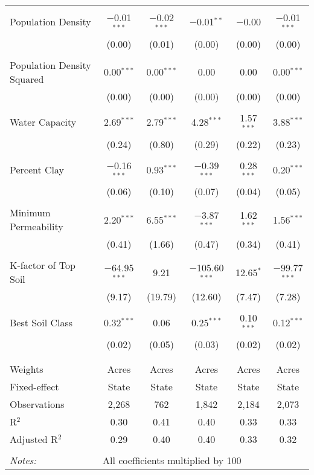 \documentclass[10pt]{article}
\begin{document}
\begin{table}[!htbp]
\begin{tabular}{@{\extracolsep{5pt}}lccccc}
  & & & & & \\ 
 Population Density & $-$0.01$^{***}$ & $-$0.02$^{***}$ & $-$0.01$^{**}$ & $-$0.00 & $-$0.01$^{***}$ \\ 
  & (0.00) & (0.01) & (0.00) & (0.00) & (0.00) \\ 
  & & & & & \\ 
 Population Density Squared & 0.00$^{***}$ & 0.00$^{***}$ & 0.00 & 0.00 & 0.00$^{***}$ \\ 
  & (0.00) & (0.00) & (0.00) & (0.00) & (0.00) \\ 
  & & & & & \\ 
 Water Capacity & 2.69$^{***}$ & 2.79$^{***}$ & 4.28$^{***}$ & 1.57$^{***}$ & 3.88$^{***}$ \\ 
  & (0.24) & (0.80) & (0.29) & (0.22) & (0.23) \\ 
  & & & & & \\ 
 Percent Clay & $-$0.16$^{***}$ & 0.93$^{***}$ & $-$0.39$^{***}$ & 0.28$^{***}$ & 0.20$^{***}$ \\ 
  & (0.06) & (0.10) & (0.07) & (0.04) & (0.05) \\ 
  & & & & & \\ 
 Minimum Permeability & 2.20$^{***}$ & 6.55$^{***}$ & $-$3.87$^{***}$ & 1.62$^{***}$ & 1.56$^{***}$ \\ 
  & (0.41) & (1.66) & (0.47) & (0.34) & (0.41) \\ 
  & & & & & \\ 
 K-factor of Top Soil & $-$64.95$^{***}$ & 9.21 & $-$105.60$^{***}$ & 12.65$^{*}$ & $-$99.77$^{***}$ \\ 
  & (9.17) & (19.79) & (12.60) & (7.47) & (7.28) \\ 
  & & & & & \\ 
 Best Soil Class & 0.32$^{***}$ & 0.06 & 0.25$^{***}$ & 0.10$^{***}$ & 0.12$^{***}$ \\ 
  & (0.02) & (0.05) & (0.03) & (0.02) & (0.02) \\ 
  & & & & & \\ 
\hline \\[-1.8ex] 
Weights & Acres & Acres & Acres & Acres & Acres \\ 
Fixed-effect & State & State & State & State & State \\ 
Observations & 2,268 & 762 & 1,842 & 2,184 & 2,073 \\ 
R$^{2}$ & 0.30 & 0.41 & 0.40 & 0.33 & 0.33 \\ 
Adjusted R$^{2}$ & 0.29 & 0.40 & 0.40 & 0.33 & 0.32 \\ 
\hline 
\hline \\[-1.8ex] 
\textit{Notes:} & \multicolumn{5}{l}{All coefficients multiplied by 100} \\ 
\end{tabular} 
\end{table} 
\end{document}
